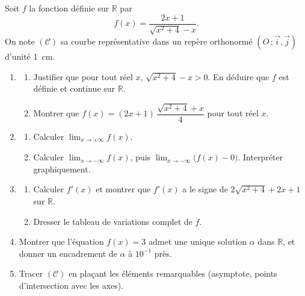 \documentclass[11pt]{article}
\begin{document}
\begin{exercice}
Soit $f$ la fonction définie sur $\mathbb{R}$ par
\[f(x)=\dfrac{2x+1}{\sqrt{x^2+4}-x}.\]
On note $(\mathcal{C})$ sa courbe représentative dans un repère orthonormé $(O\,;\vec{i},\vec{j})$ d'unité \SI{1}{cm}.
\begin{enumerate}
\item \begin{enumerate}
\item Justifier que pour tout réel $x$, $\sqrt{x^2+4}-x>0$. En déduire que $f$ est définie et continue sur $\mathbb{R}$.
\item Montrer que $f(x)=(2x+1)\,\dfrac{\sqrt{x^2+4}+x}{4}$ pour tout réel $x$.
\end{enumerate}
\item \begin{enumerate}
\item Calculer $\displaystyle\lim_{x\to +\infty}f(x)$.
\item Calculer $\displaystyle\lim_{x\to -\infty}f(x)$, puis $\displaystyle\lim_{x\to -\infty}\big(f(x)-0\big)$. Interpréter graphiquement.
\end{enumerate}
\item \begin{enumerate}
\item Calculer $f'(x)$ et montrer que $f'(x)$ a le signe de $2\sqrt{x^2+4}+2x+1$ sur $\mathbb{R}$.
\item Dresser le tableau de variations complet de $f$.
\end{enumerate}
\item Montrer que l'équation $f(x)=3$ admet une unique solution $\alpha$ dans $\mathbb{R}$, et donner un encadrement de $\alpha$ à $10^{-1}$ près.
\item Tracer $(\mathcal{C})$ en plaçant les éléments remarquables (asymptote, points d'intersection avec les axes).
\end{enumerate}
\end{exercice}
\end{document}
